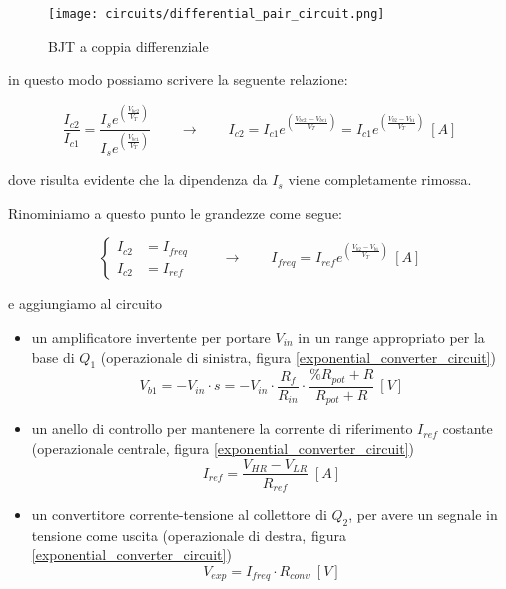 \begin{figure}[H]
    \centering
    \texttt{[image: circuits/differential\_pair\_circuit.png]}
    \caption{BJT a coppia differenziale}
    \label{differential_pair_circuit}
\end{figure}

in questo modo possiamo scrivere la seguente relazione:

\begin{equation}\label{differential_pair}
    \frac{I_{c2}}{I_{c1}}=\frac{I_s e^{\left(\frac{V_{be2}}{V_T}\right)}}{I_s e^{\left(\frac{V_{be1}}{V_T}\right)}}
    \qquad
    \rightarrow
    \qquad
    I_{c2}=I_{c1}e^{\left(\frac{V_{be2}-V_{be1}}{V_T}\right)}=I_{c1}e^{\left(\frac{V_{b2}-V_{b1}}{V_T}\right)}\ [A]
\end{equation}

dove risulta evidente che la dipendenza da $I_s$ viene completamente rimossa.

Rinominiamo a questo punto le grandezze come segue:

\begin{equation}\label{renamed_differential_pair}
    \left\{ \begin{aligned}
        I_{c2} & = I_{freq} \\
        I_{c2} & = I_{ref}
    \end{aligned} \right.
    \qquad
    \rightarrow
    \qquad
    I_{freq}=I_{ref}e^{\left(\frac{V_{b2}-V_{b1}}{V_T}\right)}\ [A]
\end{equation}

e aggiungiamo al circuito

\begin{itemize}
    \item un amplificatore invertente per portare $V_{in}$ in un range appropriato per la base
          di $Q_1$ (operazionale di sinistra, figura \ref{exponential_converter_circuit})
          \begin{equation}\label{amplifier}
              V_{b1}=-V_{in}\cdot s=
              -V_{in}\cdot\frac{R_f}{R_{in}}\cdot\frac{\%R_{pot}+R}{R_{pot}+R}\ [V]
          \end{equation}
    \item un anello di controllo per mantenere la corrente di riferimento $I_{ref}$ costante
          (operazionale centrale, figura \ref{exponential_converter_circuit})
          \begin{equation}\label{iref}
              I_{ref}=\frac{V_{HR}-V_{LR}}{R_{ref}}\ [A]
          \end{equation}
    \item un convertitore corrente-tensione al collettore di $Q_2$, per avere un segnale in
          tensione come uscita (operazionale di destra, figura \ref{exponential_converter_circuit})
          \begin{equation}\label{ivconv}
              V_{exp}=I_{freq}\cdot R_{conv}\ [V]
          \end{equation}
\end{itemize}


